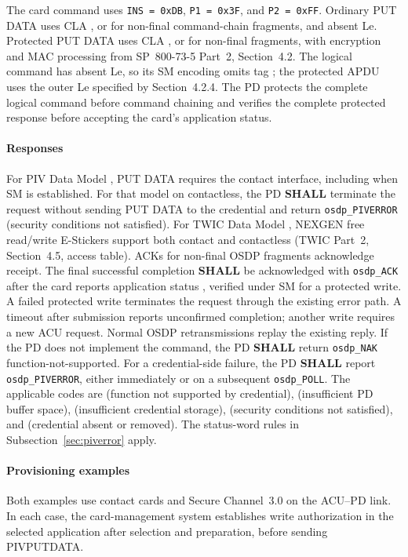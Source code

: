 The card command uses \texttt{INS = 0xDB}, \texttt{P1 = 0x3F}, and
\texttt{P2 = 0xFF}. Ordinary PUT DATA uses CLA , or 
for non-final command-chain fragments, and absent Le. Protected PUT DATA uses
CLA , or  for non-final fragments, with encryption and
MAC processing from SP~800-73-5 Part~2, Section~4.2. The logical command has
absent Le, so its SM encoding omits tag ; the protected APDU uses
the outer Le  specified by Section~4.2.4. The PD protects the complete
logical command before command chaining and verifies the complete protected
response before accepting the card's application status.



\paragraph{Responses} For PIV Data Model , PUT DATA requires the
contact interface, including when SM is established. For that model on contactless,
the PD \textbf{SHALL} terminate the
request without sending PUT DATA to the credential and return
\texttt{osdp\_PIVERROR}  (security conditions not satisfied).
For TWIC Data Model , NEXGEN free read/write E-Stickers support
both contact and contactless (TWIC Part~2, Section~4.5, access table).
ACKs for non-final OSDP fragments acknowledge receipt. The final successful
completion \textbf{SHALL} be acknowledged with \texttt{osdp\_ACK} after the
card reports application status , verified under SM for a protected
write. A failed protected write terminates the request through the existing
error path. A timeout after submission reports unconfirmed completion; another
write requires a new ACU request. Normal OSDP retransmissions replay the existing
reply.
If the PD does not implement the command, the PD \textbf{SHALL} return
\texttt{osdp\_NAK} function-not-supported. For a credential-side failure, the PD
\textbf{SHALL} report \texttt{osdp\_PIVERROR}, either immediately or on a
subsequent \texttt{osdp\_POLL}. The applicable codes are 
(function not supported by credential),  (insufficient PD buffer
space),  (insufficient credential storage), 
(security conditions not satisfied), and  (credential absent or
removed). The status-word rules in Subsection~\ref{sec:piverror} apply.

\paragraph{Provisioning examples}
Both examples use contact cards and Secure Channel~3.0 on the ACU--PD link.
In each case, the card-management system establishes write authorization in the
selected application after selection and preparation, before sending PIVPUTDATA.

